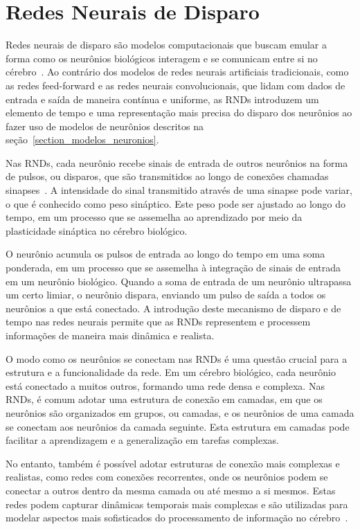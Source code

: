 \section{Redes Neurais de Disparo}

Redes neurais de disparo são modelos computacionais que buscam emular a forma como os neurônios biológicos interagem e se
comunicam entre si no cérebro~\cite{maassNetworks1997}. Ao contrário dos modelos de redes neurais artificiais tradicionais, como
as redes feed-forward e as redes neurais convolucionais, que lidam com dados de entrada e saída de maneira contínua e uniforme, as
RNDs introduzem um elemento de tempo e uma representação mais precisa do disparo dos neurônios ao fazer uso de modelos de
neurônios descritos na seção~\ref{section_modelos_neuronios}.

Nas RNDs, cada neurônio recebe sinais de entrada de outros neurônios na forma de pulsos, ou disparos, que são transmitidos ao
longo de conexões chamadas sinapses~\cite{gerstnerSpikingNeuronModels2002}. A intensidade do sinal transmitido através de uma
sinapse pode variar, o que é conhecido como peso sináptico. Este peso pode ser ajustado ao longo do tempo, em um processo que se
assemelha ao aprendizado por meio da plasticidade sináptica no cérebro biológico.

O neurônio acumula os pulsos de entrada ao longo do tempo em uma soma ponderada, em um processo que se assemelha à integração de
sinais de entrada em um neurônio biológico. Quando a soma de entrada de um neurônio ultrapassa um certo limiar, o neurônio
dispara, enviando um pulso de saída a todos os neurônios a que está conectado. A introdução deste mecanismo de disparo e de tempo
nas redes neurais permite que as RNDs representem e processem informações de maneira mais dinâmica e realista.

O modo como os neurônios se conectam nas RNDs é uma questão crucial para a estrutura e a funcionalidade da rede. Em um cérebro
biológico, cada neurônio está conectado a muitos outros, formando uma rede densa e complexa. Nas RNDs, é comum adotar uma
estrutura de conexão em camadas, em que os neurônios são organizados em grupos, ou camadas, e os neurônios de uma camada se
conectam aos neurônios da camada seguinte. Esta estrutura em camadas pode facilitar a aprendizagem e a generalização em tarefas
complexas.

No entanto, também é possível adotar estruturas de conexão mais complexas e realistas, como redes com conexões recorrentes, onde
os neurônios podem se conectar a outros dentro da mesma camada ou até mesmo a si mesmos. Estas redes podem capturar dinâmicas
temporais mais complexas e são utilizadas para modelar aspectos mais sofisticados do processamento de informação no
cérebro~\cite{izhikevichPolychronization2006}.

